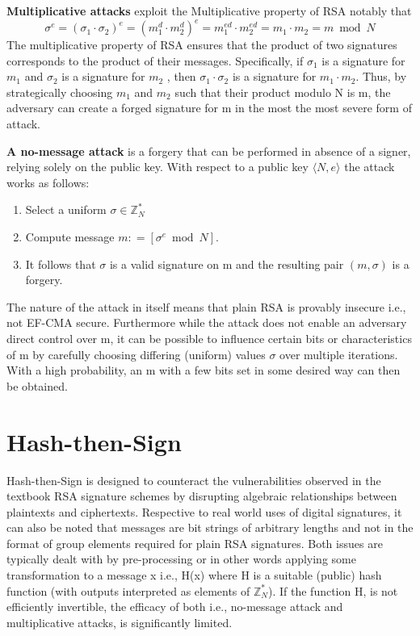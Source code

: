 \documentclass[]{final_report}
\theoremstyle{definition}
\begin{document}
\textbf{Multiplicative attacks} exploit the Multiplicative property of RSA notably that
\begin{equation}
\sigma^e = (\sigma_{1} \cdot \sigma_{2})^e = (m_{1}^d \cdot m_{2}^d)^e = m_{1}^{ed} \cdot m_{2}^{ed} = m_{1} \cdot m_{2} = m \bmod N 
\end{equation}
The multiplicative property of RSA ensures that the product of two signatures corresponds to the product of their messages. Specifically, if $\sigma_{1}$ is a signature for $m_{1}$ and $\sigma_{2}$ is a signature for $m_{2}$ , then $\sigma_{1} \cdot \sigma_{2}$ is a signature for $m_{1} \cdot m_{2}$. Thus, by strategically choosing $m_{1}$ and $m_{2}$ such that their product modulo N is m, the adversary can create a forged signature for m in the most the most severe form of attack.

\textbf{A no-message attack} is a forgery that can be performed in absence of a signer, relying solely on the public key. With respect to a public key $\langle N, e \rangle$ the attack works as follows:
\begin{enumerate}
    \item Select a uniform $\sigma \in \mathbb{Z}^*_{N}$
    \item Compute message $m : = [\sigma^e \bmod N]$.
    \item It follows that $\sigma$ is a valid signature on m and the resulting pair $(m, \sigma)$ is a forgery.
\end{enumerate}
The nature of the attack in itself means that plain RSA is provably insecure i.e., not EF-CMA secure. Furthermore while the attack does not enable an adversary direct control over m, it can be possible to influence certain bits or characteristics of m by carefully choosing differing (uniform) values $\sigma$ over multiple iterations. With a high probability, an m with a few bits set in some desired way can then be obtained.

\section{Hash-then-Sign}
Hash-then-Sign is designed to counteract the vulnerabilities observed in the textbook RSA signature schemes by disrupting algebraic relationships between plaintexts and ciphertexts. Respective to real world uses of digital signatures, it can also be noted that messages are bit strings of arbitrary lengths and not in the format of group elements required for plain RSA signatures.
Both issues are typically dealt with by pre-processing or in other words applying some transformation to a message x i.e., H(x) where H is a suitable (public) hash function (with outputs interpreted as elements of $\mathbb{Z}^*_{N}$). If the function H, is not efficiently invertible, the efficacy of both i.e., no-message attack and multiplicative attacks, is significantly limited.
\end{document}
